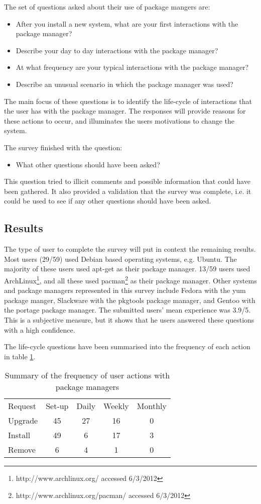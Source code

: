 The set of questions asked about their use of package mangers are:
\begin{itemize}
  \item After you install a new system, what are your first interactions with the package manager?
  \item Describe your day to day interactions with the package manager?
  \item At what frequency are your typical interactions with the package manager?
  \item Describe an unusual scenario in which the package manager was used?
\end{itemize}
The main focus of these questions is to identify the life-cycle of interactions that the user has with the package manager.
The responses will provide reasons for these actions to occur, and illuminates the users motivations to change the system.

The survey finished with the question:
\begin{itemize}
  \item What other questions should have been asked?
\end{itemize}
This question tried to illicit comments and possible information that could have been gathered.
It also provided a validation that the survey was complete, i.e. it could be used to see if any other questions should have been asked.

\subsection{Results}
The type of user to complete the survey will put in context the remaining results.
Most users (29/59) used Debian based operating systems, e.g. Ubuntu.
The majority of these users used apt-get as their package manager.
13/59  users used ArchLinux\footnote{http://www.archlinux.org/ accessed 6/3/2012},
and all these used pacman\footnote{http://www.archlinux.org/pacman/ accessed 6/3/2012} as their package manager.
Other systems and package managers represented in this survey include Fedora with the yum package manger,
Slackware with the pkgtools package manager, and Gentoo with the portage package manager.
The submitted users' mean experience was 3.9/5.
This is a subjective measure, but it shows that he users answered these questions with a high confidence. 

The life-cycle questions have been summarised into the frequency of each action in table \ref{strat.tblaction}.
\begin{table}[htp]
\begin{tabular}{l | c | c | c | c |}
Request & Set-up & Daily & Weekly & Monthly \\
Upgrade  & 45 & 27 & 16 & 0 \\
Install & 49 & 6 & 17 & 3 \\
Remove & 6 & 4 & 1 & 0\\
\end{tabular}
\caption{Summary of the frequency of user actions with package managers}
\label{strat.tblaction}
\end{table}

